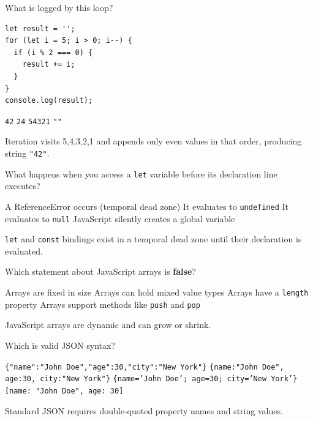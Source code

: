 \question[4]
What is logged by this loop?
\begin{lstlisting}[style=js]
let result = '';
for (let i = 5; i > 0; i--) {
  if (i % 2 === 0) {
    result += i;
  }
}
console.log(result);
\end{lstlisting}
\begin{choices}
  \CorrectChoice \texttt{42}
  \choice \texttt{24}
  \choice \texttt{54321}
  \choice \texttt{""}
\end{choices}
\begin{solution}
  Iteration visits 5,4,3,2,1 and appends only even values in that order, producing string \texttt{"42"}.
\end{solution}

\question[4]
What happens when you access a \texttt{let} variable before its declaration line executes?
\begin{choices}
  \CorrectChoice A ReferenceError occurs (temporal dead zone)
  \choice It evaluates to \texttt{undefined}
  \choice It evaluates to \texttt{null}
  \choice JavaScript silently creates a global variable
\end{choices}
\begin{solution}
  \texttt{let} and \texttt{const} bindings exist in a temporal dead zone until their declaration is evaluated.
\end{solution}

\question[4]
Which statement about JavaScript arrays is \textbf{false}?
\begin{choices}
  \CorrectChoice Arrays are fixed in size
  \choice Arrays can hold mixed value types
  \choice Arrays have a \texttt{length} property
  \choice Arrays support methods like \texttt{push} and \texttt{pop}
\end{choices}
\begin{solution}
  JavaScript arrays are dynamic and can grow or shrink.
\end{solution}

\question[4]
Which is valid JSON syntax?
\begin{choices}
  \CorrectChoice \texttt{\{"name":"John Doe","age":30,"city":"New York"\}}
  \choice \texttt{\{name:"John Doe", age:30, city:"New York"\}}
  \choice \texttt{\{name='John Doe'; age=30; city='New York'\}}
  \choice \texttt{[name: "John Doe", age: 30]}
\end{choices}
\begin{solution}
  Standard JSON requires double-quoted property names and string values.
\end{solution}

